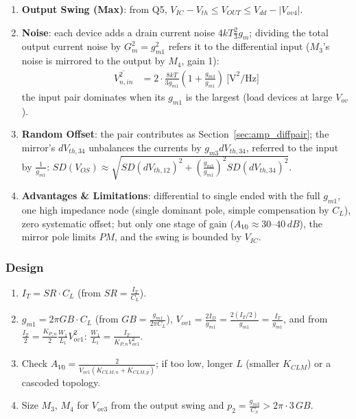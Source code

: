 \begin{enumerate}
    \paragraph{At Output:} \(V_{id} = 0\), \(V_x = 0\) (mirror gate held by the diode), a test voltage
    at \(V_{out}\) sees \(M_2\) (\(V_s \approx 0\)) and \(M_4\) to AC ground:
    \begin{align*}
      Z_{out} &= \frac{1}{g_{o2} + g_{o4}} = r_{o2} \parallel r_{o4}
    \end{align*}
  \item \textbf{Output Swing (Max)}: from Q5,
    \(V_{IC} - V_{th} \leq V_{OUT} \leq V_{dd} - |V_{ov4}|\).
  \item \textbf{Noise}: each device adds a drain current noise \(4kT\frac{2}{3}g_m\); dividing the total output
    current noise by \(G_m^2 = g_{m1}^2\) refers it to the differential input (\(M_3\)'s noise is mirrored to the output by \(M_4\), gain 1):
    \begin{align*}
      \overline{V_{n,in}^2} &= 2\cdot\frac{8kT}{3 g_{m1}}\left(1 + \frac{g_{m3}}{g_{m1}}\right) \ \text{[V}^2\text{/Hz]}
    \end{align*}
    the input pair dominates when its \(g_{m1}\) is the largest (load devices at large \(V_{ov}\)).
  \item \textbf{Random Offset}: the pair contributes as Section~\ref{sec:amp_diffpair}; the mirror's
    \(dV_{th,34}\) unbalances the currents by \(g_{m3}dV_{th,34}\), referred to the input by \(\frac{1}{g_{m1}}\):
    \(SD(V_{OS}) \approx \sqrt{SD(dV_{th,12})^2 + \left(\frac{g_{m3}}{g_{m1}}\right)^2 SD(dV_{th,34})^2}\).
  \item \textbf{Advantages \& Limitations}: differential to single ended with the full \(g_{m1}\),
    one high impedance node (single dominant pole, simple compensation by \(C_L\)), zero
    systematic offset; but only one stage of gain (\(A_{V0} \approx 30\text{--}40\,dB\)), the mirror pole limits \(PM\), and the swing is bounded by \(V_{IC}\).
\end{enumerate}

\subsubsection{Design}
\begin{enumerate}
  \item \(I_T = SR \cdot C_L\) (from \(SR = \frac{I_T}{C_L}\)).
  \item \(g_{m1} = 2\pi GB \cdot C_L\) (from \(GB = \frac{g_{m1}}{2\pi C_L}\)),
    \(V_{ov1} = \frac{2 I_D}{g_{m1}} = \frac{2 (I_T/2)}{g_{m1}} = \frac{I_T}{g_{m1}}\), and from
    \(\frac{I_T}{2} = \frac{K_{P,n}}{2}\frac{W_1}{L_1} V_{ov1}^2\):
    \(\frac{W_1}{L_1} = \frac{I_T}{K_{P,n} V_{ov1}^2}\).
  \item Check \(A_{V0} = \frac{2}{V_{ov1}(K_{CLM,n} + K_{CLM,p})}\); if too low,
    longer \(L\) (smaller \(K_{CLM}\)) or a cascoded topology.
  \item Size \(M_3\), \(M_4\) for \(V_{ov3}\) from the output swing and
    \(p_2 = \frac{g_{m3}}{C_x} > 2\pi \cdot 3\,GB\).
\end{enumerate}

